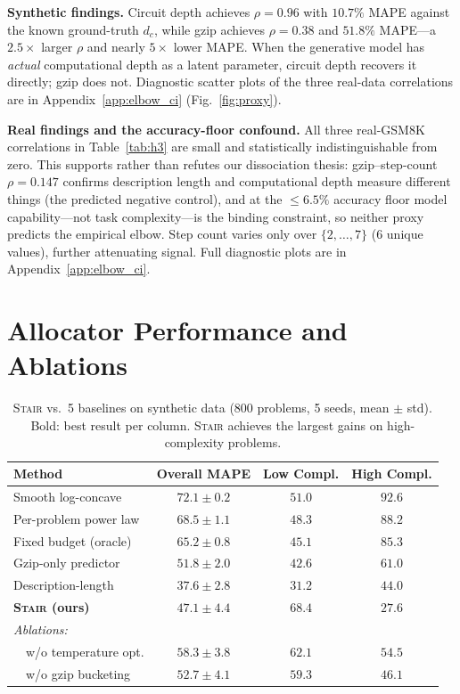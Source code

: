 \documentclass{article}
\newcommand{\method}{\textsc{Stair}}
\begin{document}
\textbf{Synthetic findings.}  Circuit depth achieves $\rho{=}0.96$ with $10.7\%$ MAPE against the known ground-truth $d_c$, while gzip achieves $\rho{=}0.38$ and $51.8\%$ MAPE---a $2.5\times$ larger $\rho$ and nearly $5\times$ lower MAPE.  When the generative model has \emph{actual} computational depth as a latent parameter, circuit depth recovers it directly; gzip does not.  Diagnostic scatter plots of the three real-data correlations are in Appendix~\ref{app:elbow_ci} (Fig.~\ref{fig:proxy}).

\textbf{Real findings and the accuracy-floor confound.}  All three real-GSM8K correlations in Table~\ref{tab:h3} are small and statistically indistinguishable from zero.  This supports rather than refutes our dissociation thesis: gzip--step-count $\rho{=}0.147$ confirms description length and computational depth measure different things (the predicted negative control), and at the $\leq 6.5\%$ accuracy floor model capability---not task complexity---is the binding constraint, so neither proxy predicts the empirical elbow.  Step count varies only over $\{2,\ldots,7\}$ (6 unique values), further attenuating signal.  Full diagnostic plots are in Appendix~\ref{app:elbow_ci}.


\section{Allocator Performance and Ablations}
\label{app:allocator_perf}

\label{sec:allocator}

\begin{table}[t]
\centering
\caption{\method{} vs.\ 5 baselines on synthetic data (800 problems, 5 seeds, mean $\pm$ std).  Bold: best result per column.  \method{} achieves the largest gains on high-complexity problems.}
\label{tab:allocator}
\small
\begin{tabular}{lccc}
\toprule
\textbf{Method} & \textbf{Overall MAPE} & \textbf{Low Compl.} & \textbf{High Compl.} \\
\midrule
Smooth log-concave & $72.1 \pm 0.2$ & $51.0$ & $92.6$ \\
Per-problem power law & $68.5 \pm 1.1$ & $48.3$ & $88.2$ \\
Fixed budget (oracle) & $65.2 \pm 0.8$ & $45.1$ & $85.3$ \\
Gzip-only predictor & $51.8 \pm 2.0$ & $42.6$ & $61.0$ \\
Description-length & $37.6 \pm 2.8$ & $31.2$ & $44.0$ \\
\midrule
\textbf{\method{} (ours)} & $\bm{47.1 \pm 4.4}$ & $68.4$ & $\bm{27.6}$ \\
\midrule
\textit{Ablations:} \\
\ \ w/o temperature opt. & $58.3 \pm 3.8$ & $62.1$ & $54.5$ \\
\ \ w/o gzip bucketing & $52.7 \pm 4.1$ & $59.3$ & $46.1$ \\
\bottomrule
\end{tabular}
\end{table}
\end{document}
